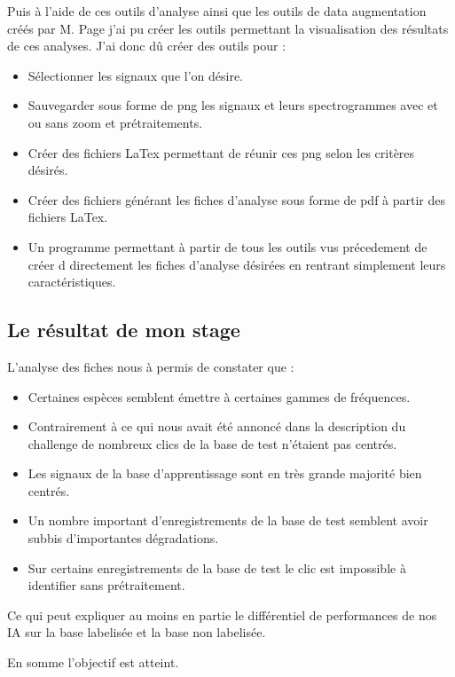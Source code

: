 Puis à l'aide de ces outils d'analyse ainsi que les outils de data augmentation créés par M. Page j'ai pu créer les outils permettant la visualisation des résultats de ces analyses. J'ai donc dû créer des outils pour :

\begin{itemize}

  \item Sélectionner les signaux que l'on désire.
  \item Sauvegarder sous forme de png les signaux et leurs spectrogrammes avec et ou sans zoom et prétraitements.
  \item Créer des fichiers LaTex permettant de réunir ces png selon les critères désirés.
  \item Créer des fichiers générant les fiches d'analyse sous forme de pdf à partir des fichiers LaTex.
  \item Un programme permettant à partir de tous les outils vus précedement de créer d directement les fiches d'analyse désirées en rentrant simplement leurs caractéristiques.

\end{itemize}


\subsection{Le résultat de mon stage}

L'analyse des fiches nous à permis de constater que :
\begin{itemize}
\item Certaines espèces semblent émettre à certaines gammes de fréquences.
\item Contrairement à ce qui nous avait été annoncé dans la description du challenge de nombreux clics de la base de test n'étaient pas centrés.
\item Les signaux de la base d'apprentissage sont en très grande majorité bien centrés.
\item Un nombre important d'enregistrements de la base de test semblent avoir subbis d'importantes dégradations.
\item Sur certains enregistrements de la base de test le clic est impossible à identifier sans prétraitement.
\end{itemize}
Ce qui peut expliquer au moins en partie le différentiel de performances de nos IA sur la base labelisée et la base non labelisée.

En somme l'objectif est atteint.


